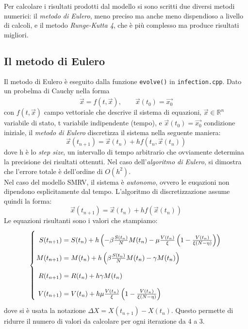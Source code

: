 \documentclass{article}
\begin{document}
\hspace{\parindent} Per calcolare i risultati prodotti dal modello 
si sono scritti due diversi metodi numerici: il \textit{metodo di Eulero},
meno preciso ma anche meno dispendioso a livello di calcoli, e il 
metodo \textit{Runge-Kutta 4}, che è più complesso ma produce 
risultati migliori.

\subsection{Il metodo di Eulero}
Il metodo di Eulero è eseguito dalla funzione \verb|evolve()| in 
\verb|infection.cpp|. Dato un probelma di Cauchy nella forma
\begin{equation} \label{eq::ODE} 
    \dot{\vec{x}} = f(t, \vec{x}), \qquad \vec{x}(t_0) = \vec{x_0}
\end{equation}
con $f(t, \vec{x})$ campo vettoriale che descrive il sistema di 
equazioni, $\vec{x} \in \mathbb{R}^n$ variabile di stato, 
t variabile indipendente (tempo), e $\vec{x}(t_0) = \vec{x_0}$
condizione iniziale, il \textit{metodo di Eulero} discretizza il 
sistema nella seguente maniera:
\begin{equation} \label{eq::Euler}
    \vec{x}(t_{n+1})=\vec{x}(t_n) + h f(t_n, \vec{x}(t_n))
\end{equation}
dove h è lo \textit{step size}, un intervallo di tempo arbitrario che 
ovviamente determina la precisione dei risultati ottenuti. 
Nel caso dell'\textit{algoritmo di Eulero}, si dimostra che l'errore 
totale è dell'ordine di $O(h^2)$. \\
Nel caso del modello SMRV, il sistema è \textit{autonomo}, ovvero le 
euqazioni non dipendono esplicitamente dal tempo. L'algoritmo di 
discretizzazione assume quindi la forma: 
\begin{equation} \label{eq::autoEuler}
    \vec{x}(t_{n+1})=\vec{x}(t_n) + h f(\vec{x}(t_n))
\end{equation}
Le equazioni risultanti sono i valori che stampiamo:
\begin{equation}\label{eq::evolve}
    \left\{ \arraycolsep=1.4pt\def\arraystretch{2.2}
    \begin{array}{rcl}
    S(t_{n+1}) & = & S(t_n) + h \left(-\beta \frac{S(t_n)}{N} M(t_n)
            - \mu \frac{V(t_n)}{\xi} \left(
            1 - \frac{V(t_n)}{\xi (N - \eta)} \right) \right) \\
    M(t_{n+1}) & = & M(t_n)+h\left(\beta \frac{S(t_n)}{N} M(t_n) 
            - \gamma M(t_n)\right) \\
    R(t_{n+1}) & = & R(t_n) + h \gamma M(t_n) \\
    V(t_{n+1}) & = & V(t_n) +h \mu \frac{V(t_n)}{\xi} \left(
            1 - \frac{V(t_n)}{\xi (N - \eta)} \right) \\
    \end{array}\right.
\end{equation}
dove si è usata la notazione $\Delta X = X(t_{n+1})-X(t_n)$. Questo
permette di ridurre il numero di valori da calcolare per ogni 
iterazione da 4 a 3.
\end{document}
